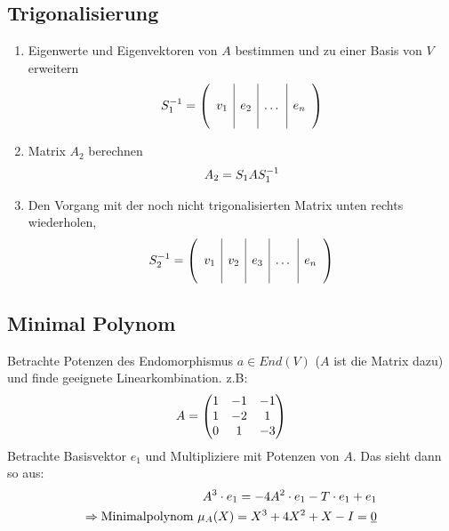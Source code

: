 \documentclass[ngerman,a4paper]{article}
\begin{document}
\subsection{Trigonalisierung}
\begin{enumerate}[label=\textbf{\arabic*.}]
	\item Eigenwerte und Eigenvektoren von $A$ bestimmen und zu einer Basis von $V$ erweitern
	\begin{align}
		S_1^{-1} = \left(\begin{array}{c|c|c|c}
		&&& \\
		v_1 & e_2 & \dots & e_n \\
		&&&
		\end{array}\right)\notag
	\end{align}
	\item Matrix $A_2$ berechnen
	\begin{align}
		A_2 = S_1AS_1^{-1}\notag
	\end{align}
	\item Den Vorgang mit der noch nicht trigonalisierten Matrix unten rechts wiederholen,
	\begin{align}
		S_2^{-1} = \left(\begin{array}{c|c|c|c|c}
		&&&& \\
		v_1 & v_2 & e_3 & \dots & e_n \\
		&&&&
		\end{array}\right)\notag
	\end{align}
\end{enumerate}

\subsection{Minimal Polynom}
Betrachte Potenzen des Endomorphismus $a \in End(V)$ ($A$ ist die Matrix dazu) und finde geeignete Linearkombination. z.B:
	\begin{align}
		A=\begin{pmatrix}
			1 & -1 & -1\\
			1 & -2 & 1\\
			0 & 1 & -3
		\end{pmatrix}\notag
	\end{align}
Betrachte Basisvektor $e_1$ und Multipliziere mit Potenzen von $A$. Das sieht dann so aus:
	\begin{align}
	A^3 \cdot e_1 = -4A^2\cdot e_1 - T\cdot e_1 + e_1\notag \\
	\Rightarrow \text{Minimalpolynom } \mu_A (X) = X^3 + 4X^2+X -I = \underline{0}\notag
	\end{align}
\end{document}
